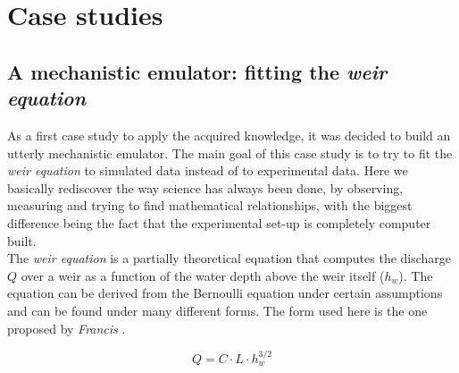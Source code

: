 \chapter{Case studies}
\label{chp:case_studies}

\section{A mechanistic emulator: fitting the \emph{weir equation}}


As a first case study to apply the acquired knowledge, it was decided to build an utterly mechanistic emulator.
The main goal of this case study is to try to fit the \emph{weir equation} to simulated data instead of to experimental data.
Here we basically rediscover the way science has always been done, by observing, measuring and trying to find mathematical relationships, with the biggest difference being the fact that the experimental set-up is completely computer built.\\

The \emph{weir equation} is a partially theoretical equation that computes the discharge $Q$ over a weir as a function of the water depth above the weir itself ($h_w$).
The equation can be derived from the Bernoulli equation under certain assumptions \autocite{bos_discharge_1989} and can be found under many different forms.
The form used here is the one proposed by \emph{Francis} \autocite{walcott_weir_1907}.

\begin{equation}\label{eq:weir_eq}
  Q = C \cdot L \cdot h_w^{3/2}
\end{equation}

